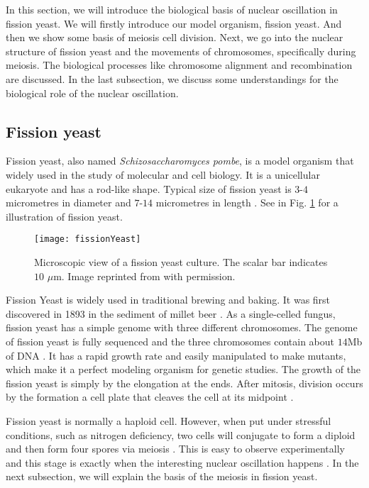 In this section, we will introduce the biological basis of nuclear oscillation in fission yeast. We will firstly introduce our model organism, fission yeast. And then we show some basis of meiosis cell division. Next, we go into the nuclear structure of fission yeast and the movements of chromosomes, specifically during meiosis. The biological processes like chromosome alignment and recombination are discussed. In the last subsection, we discuss some understandings for the biological role of the nuclear oscillation.

\subsection{Fission yeast}
\label{sub:fission_yeast}

Fission yeast, also named \emph{Schizosaccharomyces pombe}, is a model organism that widely used in the study of molecular and cell biology. It is a unicellular eukaryote and has a rod-like shape. Typical size of fission yeast is $3$-$4$ micrometres in diameter and $7$-$14$ micrometres in length \cite{Forsburg2003,Fantes2016}. See in Fig. \ref{fig:fissionYeast} for a illustration of fission yeast.

\begin{figure}[htpb]
    \centering
    \texttt{[image: fissionYeast]}
    \caption{Microscopic view of a fission yeast culture. The scalar bar indicates $10$ $\mu$m. Image reprinted from \cite{Morgan2007} with permission. }
    \label{fig:fissionYeast}
\end{figure}

Fission Yeast is widely used in traditional brewing and baking. It was first discovered in 1893 in the sediment of millet beer \cite{Fantes2016,Hoffman2015}. As a single-celled fungus, fission yeast has a simple genome with three different chromosomes. The genome of fission yeast is fully sequenced and the three chromosomes contain about $14$Mb of DNA \cite{Wood2002}. It has a rapid growth rate and easily manipulated to make mutants, which make it a perfect modeling organism for genetic studies. The growth of the fission yeast is simply by the elongation at the ends. After mitosis, division occurs by the formation a cell plate that cleaves the cell at its midpoint \cite{Forsburg2003}. 

Fission yeast is normally a haploid cell. However, when put under stressful conditions, such as nitrogen deficiency, two cells will conjugate to form a diploid and then form four spores via meiosis \cite{Coelho2013}. This is easy to observe experimentally and this stage is exactly when the interesting nuclear oscillation happens \cite{Chikashige1994}. In the next subsection, we will explain the basis of the meiosis in fission yeast. 



